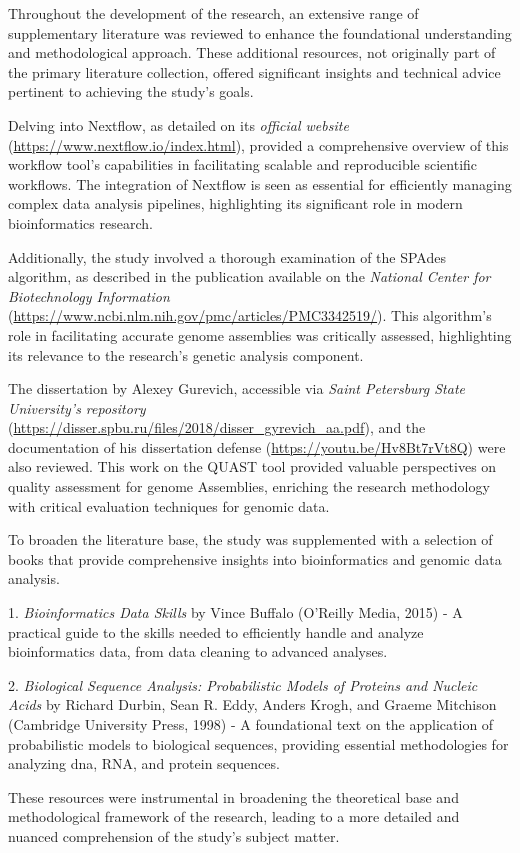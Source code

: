 Throughout the development of the research, an extensive range of supplementary literature was reviewed to enhance the foundational understanding and methodological approach. These additional resources, not originally part of the primary literature collection, offered significant insights and technical advice pertinent to achieving the study's goals.

Delving into Nextflow, as detailed on its \textit{official website} (\url{https://www.nextflow.io/index.html}), provided a comprehensive overview of this workflow tool's capabilities in facilitating scalable and reproducible scientific workflows. The integration of Nextflow is seen as essential for efficiently managing complex data analysis pipelines, highlighting its significant role in modern bioinformatics research.

Additionally, the study involved a thorough examination of the SPAdes algorithm, as described in the publication available on the \textit{National Center for Biotechnology Information} (\url{https://www.ncbi.nlm.nih.gov/pmc/articles/PMC3342519/}). This algorithm's role in facilitating accurate genome assemblies was critically assessed, highlighting its relevance to the research's genetic analysis component.

The dissertation by Alexey Gurevich, accessible via \textit{Saint Petersburg State University's repository} (\url{https://disser.spbu.ru/files/2018/disser_gyrevich_aa.pdf}), and the documentation of his dissertation defense (\url{https://youtu.be/Hv8Bt7rVt8Q}) were also reviewed. This work on the QUAST tool provided valuable perspectives on quality assessment for \gls{genome} Assemblies, enriching the research methodology with critical evaluation techniques for genomic data.

To broaden the literature base, the study was supplemented with a selection of books that provide comprehensive insights into bioinformatics and genomic data analysis.

1. \textit{Bioinformatics Data Skills} by Vince Buffalo (O'Reilly Media, 2015) - A practical guide to the skills needed to efficiently handle and analyze bioinformatics data, from data cleaning to advanced analyses.

2. \textit{Biological Sequence Analysis: Probabilistic Models of Proteins and Nucleic Acids} by Richard Durbin, Sean R. Eddy, Anders Krogh, and Graeme Mitchison (Cambridge University Press, 1998) - A foundational text on the application of probabilistic models to biological sequences, providing essential methodologies for analyzing \gls{dna}, RNA, and protein sequences.

These resources were instrumental in broadening the theoretical base and methodological framework of the research, leading to a more detailed and nuanced comprehension of the study's subject matter.


